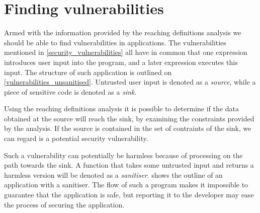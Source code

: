 \section{Finding vulnerabilities}\label{theory_finding_vulns}
Armed with the information provided by the reaching definitions analysis we should be able to find vulnerabilities in applications.
The vulnerabilities mentioned in \cref{security_vulnerabilities} all have in common that one expression introduces user input into the program, and a later expression executes this input.
The structure of such application is outlined on \cref{vulnerabilities_unsanitised}.
Untrusted user input is denoted as a \emph{source}, while a piece of sensitive code is denoted as a \emph{sink}.

Using the reaching definitions analysis it is possible to determine if the data obtained at the source will reach the sink, by examining the constraints provided by the analysis.
If the source is contained in the set of contraints of the sink, we can regard is a potential security vulnerability.

Such a vulnerability can potentially be harmless because of processing on the path towards the sink.
A function that takes some untrusted input and returns a harmless version will be denoted as a \emph{sanitiser}.
 shows the outline of an application with a sanitiser.
The flow of such a program makes it impossible to guarantee that the application is safe, but reporting it to the developer may ease the process of securing the application.



